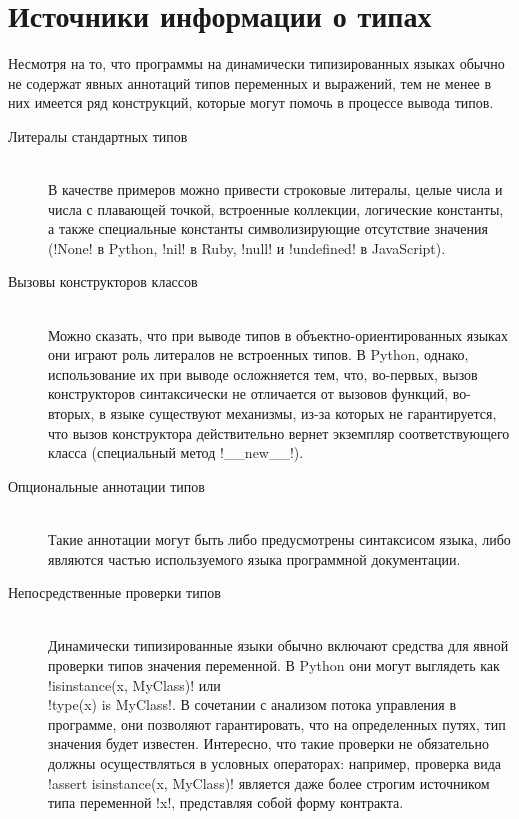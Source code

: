 \section{Источники информации о типах}
\label{sec:type-sources}

Несмотря на то, что программы на динамически типизированных языках обычно не
содержат явных аннотаций типов переменных и выражений, тем не менее в них
имеется ряд конструкций, которые могут помочь в процессе вывода типов. 

\begin{description}
    \item[Литералы стандартных типов] \hfill \\
        В качестве примеров можно привести
        строковые литералы, целые числа и числа с плавающей точкой, встроенные
        коллекции, логические константы, а также специальные константы символизирующие
        отсутствие значения (!None! в Python, !nil! в Ruby,
        !null! и !undefined! в JavaScript).
        
    \item[Вызовы конструкторов классов] \hfill \\
        Можно сказать, что при выводе типов в объектно-ориентированных языках
        они играют роль литералов не встроенных типов. В Python, однако,
        использование их при выводе осложняется тем, что, во-первых, вызов
        конструкторов синтаксически не отличается от вызовов функций, во-вторых,
        в языке существуют механизмы, из-за которых не гарантируется, что вызов
        конструктора действительно вернет экземпляр соответствующего класса
        (специальный метод !__new__!).

    \item[Опциональные аннотации типов] \hfill \\
        Такие аннотации могут быть либо предусмотрены синтаксисом языка, либо
        являются частью используемого языка программной документации.

    \item[Непосредственные проверки типов] \hfill \\
        Динамически типизированные языки обычно включают средства для явной
        проверки типов значения переменной. В Python они могут
        выглядеть как !isinstance(x, MyClass)! или \\
        !type(x) is MyClass!. В
        сочетании с анализом потока управления в программе, они позволяют
        гарантировать, что на определенных путях, тип значения будет известен. 
        Интересно, что такие проверки не обязательно должны осуществляться в условных
        операторах: например, проверка вида !assert isinstance(x, MyClass)!
        является даже более строгим источником типа переменной !x!, представляя
        собой форму контракта.


\end{description}
